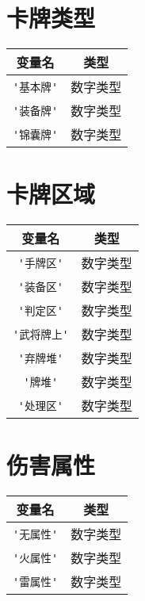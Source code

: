 \section{卡牌类型}

\begin{center}
\begin{longtable}{|c|c|}
\hline \textbf{变量名} & \textbf{类型} \\
\hline \verb|'基本牌'| & 数字类型 \\
\hline \verb|'装备牌'| & 数字类型 \\
\hline \verb|'锦囊牌'| & 数字类型 \\
\hline
\end{longtable}
\end{center}

\section{卡牌区域}

\begin{center}
\begin{longtable}{|c|c|}
\hline \textbf{变量名} & \textbf{类型} \\
\hline \verb|'手牌区'| & 数字类型 \\
\hline \verb|'装备区'| & 数字类型 \\
\hline \verb|'判定区'| & 数字类型 \\
\hline \verb|'武将牌上'| & 数字类型 \\
\hline \verb|'弃牌堆'| & 数字类型 \\
\hline \verb|'牌堆'| & 数字类型 \\
\hline \verb|'处理区'| & 数字类型 \\
\hline
\end{longtable}
\end{center}

\section{伤害属性}

\begin{center}
\begin{longtable}{|c|c|}
\hline \textbf{变量名} & \textbf{类型} \\
\hline \verb|'无属性'| & 数字类型 \\
\hline \verb|'火属性'| & 数字类型 \\
\hline \verb|'雷属性'| & 数字类型 \\
\hline
\end{longtable}
\end{center}

